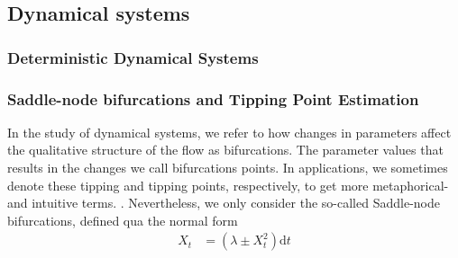 \subsection{Dynamical systems}
\subsubsection{Deterministic Dynamical Systems}



\subsubsection{Saddle-node bifurcations and Tipping Point Estimation}
In the study of dynamical systems, we refer to how changes in parameters affect the qualitative structure of the flow as bifurcations. The parameter values that results in the changes we call bifurcations points. In applications, we sometimes denote these tipping and tipping points, respectively, to get more metaphorical- and intuitive terms. \cite{Strogatz2019_gv}. Nevertheless, we only consider the so-called Saddle-node bifurcations, defined qua the normal form
\begin{align}
    X_t &= \left(\lambda \pm X_t^2\right) \mathrm{d}t \label{standardForm}
\end{align}

